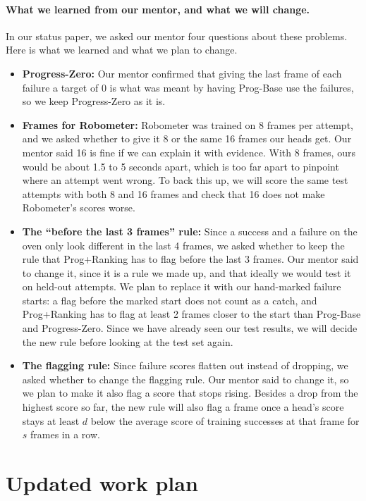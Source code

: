 \documentclass{article}
\begin{document}
\paragraph{What we learned from our mentor, and what we will change.} In our status paper, we asked our mentor four questions about these problems. Here is what we learned and what we plan to change.
\begin{itemize}
    \item \textbf{Progress-Zero:} Our mentor confirmed that giving the last frame of each failure a target of 0 is what was meant by having Prog-Base use the failures, so we keep Progress-Zero as it is.
    \item \textbf{Frames for Robometer:} Robometer was trained on 8 frames per attempt, and we asked whether to give it 8 or the same 16 frames our heads get. Our mentor said 16 is fine if we can explain it with evidence. With 8 frames, ours would be about 1.5 to 5 seconds apart, which is too far apart to pinpoint where an attempt went wrong. To back this up, we will score the same test attempts with both 8 and 16 frames and check that 16 does not make Robometer's scores worse.
    \item \textbf{The ``before the last 3 frames'' rule:} Since a success and a failure on the oven only look different in the last 4 frames, we asked whether to keep the rule that Prog+Ranking has to flag before the last 3 frames. Our mentor said to change it, since it is a rule we made up, and that ideally we would test it on held-out attempts. We plan to replace it with our hand-marked failure starts: a flag before the marked start does not count as a catch, and Prog+Ranking has to flag at least 2 frames closer to the start than Prog-Base and Progress-Zero. Since we have already seen our test results, we will decide the new rule before looking at the test set again.
    \item \textbf{The flagging rule:} Since failure scores flatten out instead of dropping, we asked whether to change the flagging rule. Our mentor said to change it, so we plan to make it also flag a score that stops rising. Besides a drop from the highest score so far, the new rule will also flag a frame once a head's score stays at least $d$ below the average score of training successes at that frame for $s$ frames in a row.
\end{itemize}


\section{Updated work plan}
\end{document}
